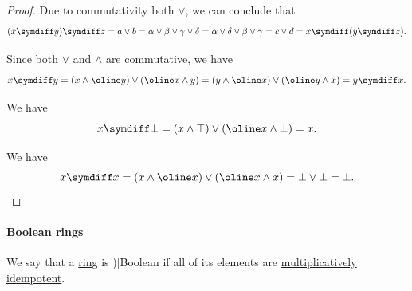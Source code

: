 \begin{proof}
  Due to commutativity both \( \vee \), we can conclude that
  \begin{equation*}
    (x \symdiff y) \symdiff z
    =
    a \vee b
    =
    \alpha \vee \beta \vee \gamma \vee \delta
    =
    \alpha \vee \delta \vee \beta \vee \gamma
    =
    c \vee d
    =
    x \symdiff (y \symdiff z).
  \end{equation*}

   Since both \( \vee \) and \( \wedge \) are commutative, we have
  \begin{equation*}
    x \symdiff y = (x \wedge \oline y) \vee (\oline x \wedge y) = (y \wedge \oline x) \vee (\oline y \wedge x) = y \symdiff x.
  \end{equation*}

   We have
  \begin{equation*}
    x \symdiff \bot = (x \wedge \top) \vee (\oline x \wedge \bot) = x.
  \end{equation*}

   We have
  \begin{equation*}
    x \symdiff x = (x \wedge \oline x) \vee (\oline x \wedge x) = \bot \vee \bot = \bot.
  \end{equation*}
\end{proof}

\paragraph{Boolean rings}

\begin{definition}\label{def:boolean_ring}
  We say that a \hyperref[def:ring]{ring} is \term[ru=Булево (кольцо) (\cite[75]{Владимиров1969БулевыАлгебры})]{Boolean} if all of its elements are \hyperref[def:semiring_idempotent]{multiplicatively idempotent}.
\end{definition}


